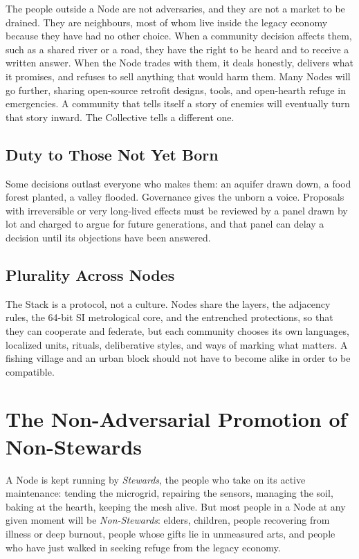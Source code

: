 The people outside a Node are not adversaries, and they are not a market to be drained. They are neighbours, most of whom live inside the legacy economy because they have had no other choice. When a community decision affects them, such as a shared river or a road, they have the right to be heard and to receive a written answer. When the Node trades with them, it deals honestly, delivers what it promises, and refuses to sell anything that would harm them. Many Nodes will go further, sharing open-source retrofit designs, tools, and open-hearth refuge in emergencies. A community that tells itself a story of enemies will eventually turn that story inward. The Collective tells a different one.

\subsection{Duty to Those Not Yet Born}

Some decisions outlast everyone who makes them: an aquifer drawn down, a food forest planted, a valley flooded. Governance gives the unborn a voice. Proposals with irreversible or very long-lived effects must be reviewed by a panel drawn by lot and charged to argue for future generations, and that panel can delay a decision until its objections have been answered.

\subsection{Plurality Across Nodes}

The Stack is a protocol, not a culture. Nodes share the layers, the adjacency rules, the 64-bit SI metrological core, and the entrenched protections, so that they can cooperate and federate, but each community chooses its own languages, localized units, rituals, deliberative styles, and ways of marking what matters. A fishing village and an urban block should not have to become alike in order to be compatible.

\section{The Non-Adversarial Promotion of Non-Stewards}

A Node is kept running by \textit{Stewards}, the people who take on its active maintenance: tending the microgrid, repairing the sensors, managing the soil, baking at the hearth, keeping the mesh alive. But most people in a Node at any given moment will be \textit{Non-Stewards}: elders, children, people recovering from illness or deep burnout, people whose gifts lie in unmeasured arts, and people who have just walked in seeking refuge from the legacy economy.

